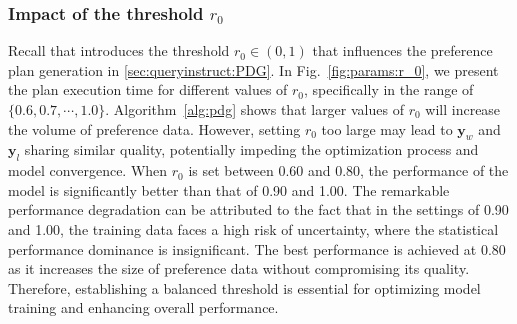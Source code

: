 
\subsubsection{Impact of the threshold $r_0$} 
Recall that \LLMQO introduces the threshold $r_0 \in (0, 1)$ that influences the preference plan generation in \cref{sec:queryinstruct:PDG}.
In Fig.~\ref{fig:params:r_0}, we present the plan execution time for different values of $r_0$, specifically in the range of $\{0.6, 0.7, \cdots, 1.0\}$. 
Algorithm~\ref{alg:pdg} shows that larger values of $r_0$ will increase the volume of preference data. However, setting $r_0$ too large may lead to $\bm{y}_w$ and $\bm{y}_l$ sharing similar quality, potentially impeding the optimization process and model convergence.
%
When $r_0$ is set between 0.60 and 0.80, the  performance of the model is significantly better than that of 0.90 and 1.00. 
The remarkable performance degradation can be attributed to the fact that in the settings of 0.90 and 1.00, the training data faces a high risk of uncertainty, where the statistical performance dominance is insignificant. 
The best performance is achieved at 0.80 as it increases the size of preference data without compromising its quality.
%
Therefore, establishing a balanced threshold is essential for optimizing model training and enhancing overall performance.

